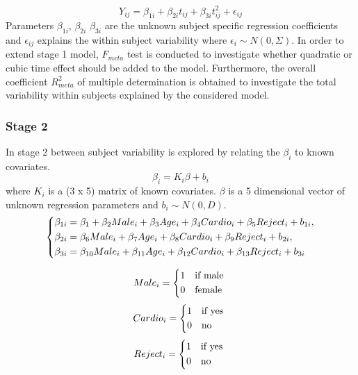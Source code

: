 \documentclass[11pt]{article}
\begin{document}
\begin{equation}\label{model3}
Y_{ij}=\beta_{1i}+\beta_{2i}t_{ij}+\beta_{3i}t_{ij}^2+\epsilon_{ij}
\end{equation}
Parameters $\beta_{1i}$, $\beta_{2i}$ $\beta_{3i}$ are the unknown subject specific regression coefficients and $\epsilon_{ij}$ explains the within subject variability where $\epsilon_{i} \sim N(0,\Sigma)$. In order to extend stage 1 model, $F_{meta}$ test is conducted to investigate whether quadratic or cubic time effect should be added to the model. Furthermore, the overall coefficient $R^{2}_{meta}$ of multiple determination is obtained to investigate the total variability within subjects explained by the considered model.

\subsubsection*{Stage 2}
In stage 2 between subject variability is explored by relating the $\beta_{i}$ to known covariates. 
\begin{equation}\label{model4}
\beta_{i}=K_{i}\beta+ b_{i}
\end{equation}
where 
$K_{i}$ is a (3 x 5) matrix of known covariates. $\beta$ is a 5 dimensional vector of unknown regression parameters and $b_{i} \sim N(0,D)$.\\
\[ \begin{dcases*} \beta_{1i} = \beta_{1} + \beta_{2}Male_{i} + \beta_{3}Age_{i} + \beta_{4}Cardio_{i} + \beta_{5}Reject_{i}+ b_{1i},\\ 
\beta_{2i} = \beta_{6}Male_{i} + \beta_{7}Age_{i} + \beta_{8}Cardio_{i} + \beta_{9}Reject_{i}+ b_{2i},\\
\beta_{3i} =  \beta_{10}Male_{i} + \beta_{11}Age_{i} + \beta_{12}Cardio_{i} + \beta_{13}Reject_{i}+ b_{3i}\\
\end{dcases*}  \]

 \[ Male_{i} = \begin{dcases*} 1 & if male \\ 
0 & female\\ \end{dcases*}  \]
 \[ Cardio_{i} = \begin{dcases*} 1 & if yes \\ 
0 & no\\ \end{dcases*}  \]
\[ Reject_{i} = \begin{dcases*} 1 & if yes \\ 
0 & no\\ \end{dcases*}  \]
\end{document}
